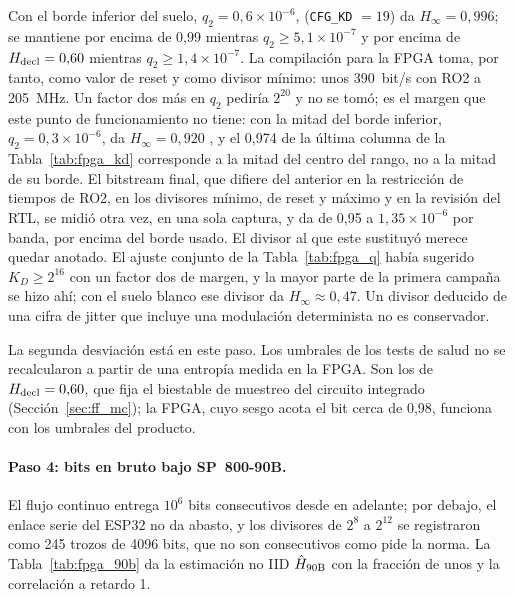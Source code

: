 Con el borde inferior del suelo, $q_2 = 0{,}6\times10^{-6}$, 
(\texttt{CFG\_KD} $= 19$) da $H_\infty = 0{,}996$; se mantiene por encima
de 0,99 mientras $q_2 \ge 5{,}1\times10^{-7}$ y por encima de
$H_{\mathrm{decl}} = 0{,}60$ mientras $q_2 \ge 1{,}4\times10^{-7}$. La compilación
para la \ac{FPGA} toma, por tanto,  como valor de reset y como
divisor mínimo: unos 390~bit/s con RO2 a 205~MHz. Un factor dos más en
$q_2$ pediría $2^{20}$ y no se tomó; es el margen que este punto de
funcionamiento no tiene: con la mitad del borde inferior,
$q_2 = 0{,}3\times10^{-6}$,  da $H_\infty = 0{,}920$ \est{}, y el
0,974 de la última columna de la Tabla~\ref{tab:fpga_kd} corresponde a
la mitad del centro del rango, no a la mitad de su borde. El bitstream
final, que difiere del anterior en
la restricción de tiempos de RO2, en los divisores mínimo, de reset y
máximo y en la revisión del \ac{RTL}, se midió otra
vez, en una sola captura, y da de 0,95 a $1{,}35\times10^{-6}$ por banda, por encima del borde
usado. El divisor al que este sustituyó merece quedar anotado. El ajuste
conjunto de la Tabla~\ref{tab:fpga_q} había sugerido $K_D \ge 2^{16}$ con
un factor dos de margen, y la mayor parte de la primera campaña se hizo
ahí; con el suelo blanco ese divisor da $H_\infty \approx 0{,}47$. Un
divisor deducido de una cifra de jitter que incluye una modulación
determinista no es conservador.

La segunda desviación está en este paso. Los umbrales de los tests de
salud no se recalcularon a partir de una entropía medida en la
\ac{FPGA}. Son los de $H_{\mathrm{decl}} = 0{,}60$, que fija el biestable de
muestreo del circuito integrado (Sección~\ref{sec:ff_mc}); la \ac{FPGA},
cuyo sesgo acota el bit cerca de 0,98, funciona con los umbrales del
producto.

\paragraph{Paso 4: bits en bruto bajo SP~800-90B.} El flujo continuo
entrega $10^6$ bits consecutivos desde  en adelante; por debajo,
el enlace serie del ESP32 no da abasto, y los divisores de $2^{8}$ a
$2^{12}$ se registraron como 245 trozos de 4096 bits, que no son
consecutivos como pide la norma. La Tabla~\ref{tab:fpga_90b} da la
estimación no IID $\hat{H}_{\mathrm{90B}}$ con la fracción de unos y la correlación a
retardo 1.

